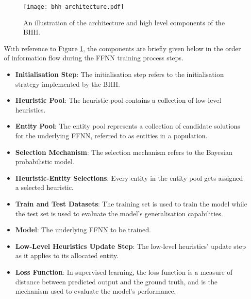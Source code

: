 \begin{figure}[htbp]
      \centering
      \texttt{[image: bhh\_architecture.pdf]}
      \caption[An illustration of
            the architecture and high level components of the \acf{BHH}.]{An illustration of
            the architecture and high level components of the \acf{BHH}.}
      \label{fig:bhh_architecture}
\end{figure}

With reference to Figure \ref{fig:bhh_architecture}, the components are briefly given below in the order of information flow during the \acs{FFNN} training process steps.

\begin{itemize}
      \item \textbf{Initialisation Step}: The initialisation step refers to the initialisation strategy implemented by the \acs{BHH}.

      \item \textbf{Heuristic Pool}: The heuristic pool contains a collection of low-level heuristics.

      \item \textbf{Entity Pool}: The entity pool represents a collection of candidate solutions for the underlying \acs{FFNN}, referred to as entities in a population.

      \item \textbf{Selection Mechanism}: The selection mechanism refers to the Bayesian probabilistic model.

      \item \textbf{Heuristic-Entity Selections}: Every entity in the entity pool gets assigned a selected heuristic.

      \item \textbf{Train and Test Datasets}: The training set is used to train the model while the test set is used to evaluate the model's generalisation capabilities.

      \item \textbf{Model}: The underlying \acs{FFNN} to be trained.

      \item \textbf{Low-Level Heuristics Update Step}: The low-level heuristics' update step as it applies to its allocated entity.

      \item \textbf{Loss Function}: In supervised learning, the loss function is a measure of distance between predicted output and the ground truth, and is the mechanism used to evaluate the model's performance.


\end{itemize}
